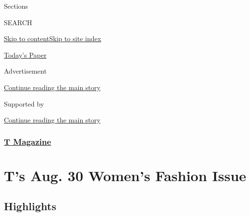 Sections

SEARCH

\protect\hyperlink{site-content}{Skip to
content}\protect\hyperlink{site-index}{Skip to site index}

\href{https://myaccount.nytimes3xbfgragh.onion/auth/login?response_type=cookie\&client_id=vi}{}

\href{https://www.nytimes3xbfgragh.onion/section/todayspaper}{Today's
Paper}

Advertisement

\protect\hyperlink{after-top}{Continue reading the main story}

Supported by

\protect\hyperlink{after-sponsor}{Continue reading the main story}

\hypertarget{t-magazine}{%
\subsubsection{\texorpdfstring{\href{/section/t-magazine}{T
Magazine}}{T Magazine}}\label{t-magazine}}

\hypertarget{ts-aug-30-womens-fashion-issue}{%
\section{T's Aug. 30 Women's Fashion
Issue}\label{ts-aug-30-womens-fashion-issue}}

\hypertarget{highlights}{%
\subsection{Highlights}\label{highlights}}

